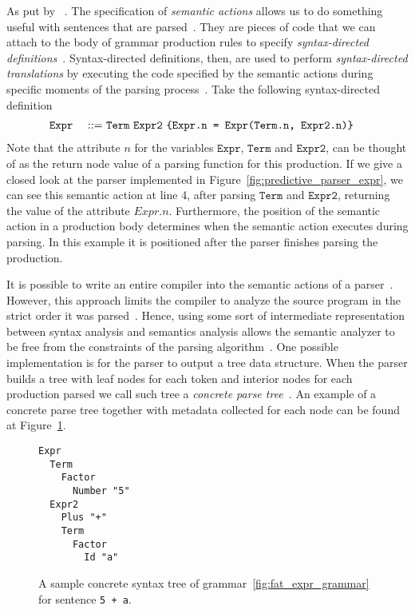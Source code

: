 \documentclass[
  oneside,
  english,
  coorientadorbanca,
  embeddedlogo,
  noabntexcite
]{ufsc-thesis-rn46-2019}
\newcommand{\bnfvar}[1]{\ \bnfvars{#1}}
\newcommand{\bnfvars}[1]{\texttt{#1}}
\newcommand{\bnfprod}[2]{\bnfvars{#1} &\ &::= & #2}
\begin{document}
As put by~\textcite{appel2003modern} .
The specification of \textit{semantic actions} allows us to do something useful with sentences that are parsed~\cite{appel2003modern}.
They are pieces of code that we can attach to the body of grammar production rules to specify \textit{syntax-directed definitions}~\cite{Aho:2006:CPT:1177220}.
Syntax-directed definitions, then, are used to perform \textit{syntax-directed translations} by executing the code specified by the semantic actions during specific moments of the parsing process~\cite{Aho:2006:CPT:1177220}.
Take the following syntax-directed definition
\begin{alignat}{2}
  \bnfprod{Expr}{\bnfvar{Term} \bnfvar{Expr2}\ \text{\texttt{\{Expr.n = Expr(Term.n, Expr2.n)\}}}} \label{eq:sdd_example}
\end{alignat}
Note that the attribute $n$ for the variables $\bnfvars{Expr}$, $\bnfvars{Term}$ and $\bnfvars{Expr2}$, can be thought of as the return node value of a parsing function for this production.
If we give a closed look at the parser implemented in Figure~\ref{fig:predictive_parser_expr}, we can see this semantic action at line 4, after parsing $\bnfvars{Term}$ and $\bnfvars{Expr2}$, returning the value of the attribute $Expr.n$.
Furthermore, the position of the semantic action in a production body determines when the semantic action executes during parsing.
In this example it is positioned after the parser finishes parsing the production.

It is possible to write an entire compiler into the semantic actions of a parser~\cite{appel2003modern}.
However, this approach limits the compiler to analyze the source program in the strict order it was parsed~\cite{appel2003modern}.
Hence, using some sort of intermediate representation between syntax analysis and semantics analysis allows the semantic analyzer to be free from the constraints of the parsing algorithm~\cite{appel2003modern}.
One possible implementation is for the parser to output a tree data structure.
When the parser builds a tree with leaf nodes for each token and interior nodes for each production parsed we call such tree a \textit{concrete parse tree}~\cite{appel2003modern}.
An example of a concrete parse tree together with metadata collected for each node can be found at Figure~\ref{fig:concrete_syntax_tree}.

\begin{figure}[ht]
  \centering
  \begin{minipage}{0.5\textwidth}
    \begin{verbatim}
Expr
  Term
    Factor
      Number "5"
  Expr2
    Plus "+"
    Term
      Factor
        Id "a"
    \end{verbatim}
  \end{minipage}
  \caption{
    A sample concrete syntax tree of grammar~\ref{fig:fat_expr_grammar} for sentence \texttt{5 + a}.
  }\label{fig:concrete_syntax_tree}
\end{figure}
\end{document}
